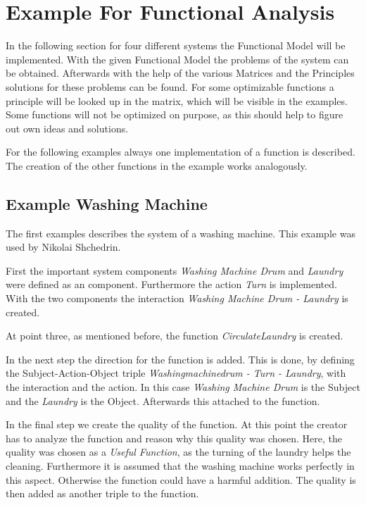 \section{Example For Functional Analysis}
\label{sec:examples}

In the following section for four different systems the Functional Model will be implemented.
With the given Functional Model the problems of the system can be obtained.
Afterwards with the help of the various Matrices and the Principles solutions for these problems can be found.
For some optimizable functions a principle will be looked up in the matrix, which will be visible in the examples. 
Some functions will not be optimized on purpose, as this should help to figure out own ideas and solutions.

For the following examples always one implementation of a function is described.
The creation of the other functions in the example works analogously.

\subsection{Example Washing Machine}

The first examples describes the system of a washing machine. 
This example was used by Nikolai Shchedrin. 

First the important system components \textit{Washing Machine Drum} and \textit{Laundry} were defined as an component.
Furthermore the action \textit{Turn} is implemented.
With the two components the interaction \textit{Washing Machine Drum - Laundry} is created.

At point three, as mentioned before, the function \textit{CirculateLaundry} is created. 

In the next step the direction for the function is added. 
This is done, by defining the Subject-Action-Object triple \textit{Washingmachinedrum - Turn - Laundry}, with the interaction and the action.
In this case \textit{Washing Machine Drum} is the Subject and the \textit{Laundry} is the Object.
Afterwards this attached to the function.

In the final step we create the quality of the function. 
At this point the creator has to analyze the function and reason why this quality was chosen.
Here, the quality was chosen as a \textit{Useful Function}, as the turning of the laundry helps the cleaning.
Furthermore it is assumed that the washing machine works perfectly in this aspect.
Otherwise the function could have a harmful addition.
The quality is then added as another triple to the function.

